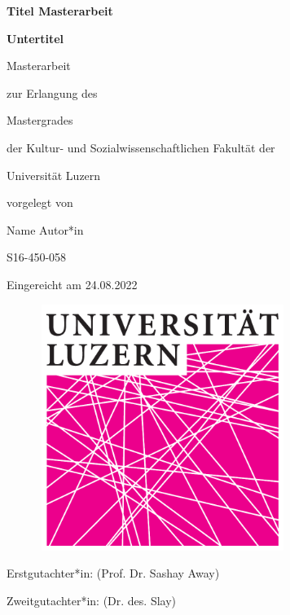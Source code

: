 \begin{titlepage}

\begin{center}

\Huge \textbf{Titel Masterarbeit}

\Large \textbf{Untertitel}

\large Masterarbeit

\large zur Erlangung des

\large Mastergrades

\large der Kultur- und Sozialwissenschaftlichen Fakultät der

\large Universität Luzern



\large vorgelegt von



\large Name Autor*in

\large S16-450-058

\large Eingereicht am 24.08.2022


\end{center}

\begin{figure}[!htbp]
		\begin{center}
			\includegraphics[height=8cm, width=8cm]{data/Logo_Universitaet_Luzern.pdf}
		\end{center}
\end{figure}

\begin{flushleft}
\small Erstgutachter*in: (Prof. Dr. Sashay Away)

\small Zweitgutachter*in: (Dr. des. Slay)
\end{flushleft}
\end{titlepage}